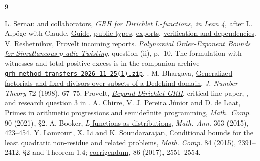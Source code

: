 \documentclass[11pt]{article}
\newcommand{\ghlink}[2]{\href{https://github.com/lsernau/grh-lean/blob/72fead102f663d5c7a407964a13dc0cf9d977207/#1}{#2}}
\begin{document}
\begin{thebibliography}{9}\small\raggedright
{} L. Sernau and collaborators, \emph{GRH for Dirichlet $L$-functions, in Lean 4}, after L. Alp\"oge with Claude. \ghlink{grh/GUIDE.md}{Guide}, \ghlink{grh/src/Statements.lean}{public types}, \ghlink{grh/src/Main.lean}{exports}, \ghlink{grh/README.md}{verification and dependencies}.
 V. Reshetnikov, ProveIt incoming reports. \href{https://github.com/VladimirReshetnikov/ProveIt/blob/6fe2c1bd450aa7f19eab17fb9a6e76170b4fce00/docs/incoming/grh_quantitative_twists_2026-11-25.zip}{\emph{Polynomial Order-Exponent Bounds for Simultaneous $p$-adic Twisting}}, question (ii), p.\ 10. The formulation with witnesses and total positive excess is in the companion archive \href{https://github.com/VladimirReshetnikov/ProveIt/blob/6fe2c1bd450aa7f19eab17fb9a6e76170b4fce00/docs/incoming/grh_method_transfers_2026-11-25(1).zip}{\texttt{grh\_method\_transfers\_2026-11-25(1).zip}}, .
 M. Bhargava, \href{https://www.sciencedirect.com/science/article/pii/S0022314X9892220X}{Generalized factorials and fixed divisors over subsets of a Dedekind domain}, \emph{J. Number Theory} 72 (1998), 67--75.
 ProveIt, \href{https://github.com/VladimirReshetnikov/ProveIt/blob/6fe2c1bd450aa7f19eab17fb9a6e76170b4fce00/docs/incoming/dirichlet-grh-research.zip}{\emph{Beyond Dirichlet GRH}}, critical-line paper, ,  and research question 3 in .
 A. Chirre, V. J. Pereira J\'unior and D. de Laat, \href{https://doi.org/10.1090/mcom/3638}{Primes in arithmetic progressions and semidefinite programming}, \emph{Math. Comp.} 90 (2021), \S2.
 A. Booker, \href{https://doi.org/10.1007/s00208-015-1178-z}{$L$-functions as distributions}, \emph{Math. Ann.} 363 (2015), 423--454.
 Y. Lamzouri, X. Li and K. Soundararajan, \href{https://arxiv.org/abs/1309.3595}{Conditional bounds for the least quadratic non-residue and related problems}, \emph{Math. Comp.} 84 (2015), 2391--2412, \S2 and Theorem 1.4; \href{https://doi.org/10.1090/mcom/3261}{corrigendum}, 86 (2017), 2551--2554.
\end{thebibliography}
\end{document}
